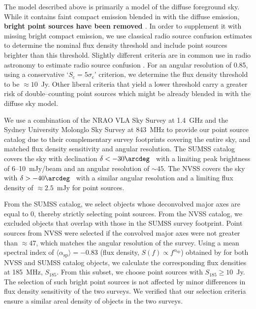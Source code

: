\documentclass[preprint2,iop,numberedappendix,twocolappendix,appendixfloats]{emulateapj}
\begin{document}
The model described above is primarily a model of the diffuse foreground sky. While it contains faint compact emission blended in with the diffuse emission, {\bf bright point sources have been removed \citep{deo08}}. In order to supplement it with missing bright compact emission, we use classical radio source confusion estimates to determine the nominal flux density threshold and include point sources brighter than this threshold. Slightly different criteria are in common use in radio astronomy to estimate radio source confusion \citep[see Appendix of][and references therein]{thy13}. For an angular resolution of 0.85\arcdeg, using a conservative `$S_\textrm{c}=5\sigma_\textrm{c}$' criterion, we determine the flux density threshold to be $\approx 10$~Jy. Other liberal criteria that yield a lower threshold carry a greater risk of double--counting point sources which might be already blended in with the diffuse sky model. 

We use a combination of the NRAO VLA Sky Survey \citep[NVSS;][]{con98} at 1.4~GHz and the Sydney University Molonglo Sky Survey \citep[SUMSS;][]{boc99,mau03} at 843~MHz to provide our point source catalog due to their complementary survey footprints covering the entire sky, and matched flux density sensitivity and angular resolution. The SUMSS catalog covers the sky with declination $\delta < -30\arcdeg$~ with a limiting peak brightness of 6--10~mJy/beam and an angular resolution of $\sim 45$\arcsec. The NVSS covers the sky with $\delta > -40\arcdeg$~ with a similar angular resolution and a limiting flux density of $\approx 2.5$~mJy for point sources. 

From the SUMSS catalog, we select objects whose deconvolved major axes are equal to 0\arcsec, thereby strictly selecting point sources. From the NVSS catalog, we excluded objects that overlap with those in the SUMSS survey footprint. Point sources from NVSS were selected if the convolved major axes were not greater than $\approx 47$\arcsec, which matches the angular resolution of the survey. Using a mean spectral index of $\langle\alpha_\textrm{sp}\rangle=-0.83$ (flux density, $S(f)\propto f^{\alpha_\textrm{sp}}$) obtained by \citet{mau03} for both NVSS and SUMSS catalog objects, we calculate the corresponding flux densities at 185~MHz, $S_{185}$. From this subset, we choose point sources with $S_{185}\geq 10$~Jy. The selection of such bright point sources is not affected by minor differences in flux density sensitivity of the two surveys. We verified that our selection criteria ensure a similar areal density of objects in the two surveys. 
\end{document}
